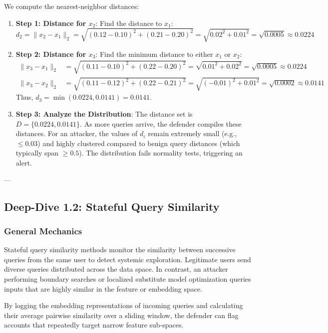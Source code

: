 \documentclass{article}
\begin{document}
We compute the nearest-neighbor distances:
\begin{enumerate}
    \item \textbf{Step 1: Distance for $x_2$}: Find the distance to $x_1$:
    $$d_2 = \|x_2 - x_1\|_2 = \sqrt{(0.12 - 0.10)^2 + (0.21 - 0.20)^2} = \sqrt{0.02^2 + 0.01^2} = \sqrt{0.0005} \approx 0.0224$$
    
    \item \textbf{Step 2: Distance for $x_3$}: Find the minimum distance to either $x_1$ or $x_2$:
    \begin{align*}
        \|x_3 - x_1\|_2 &= \sqrt{(0.11 - 0.10)^2 + (0.22 - 0.20)^2} = \sqrt{0.01^2 + 0.02^2} = \sqrt{0.0005} \approx 0.0224 \\
        \|x_3 - x_2\|_2 &= \sqrt{(0.11 - 0.12)^2 + (0.22 - 0.21)^2} = \sqrt{(-0.01)^2 + 0.01^2} = \sqrt{0.0002} \approx 0.0141
    \end{align*}
    Thus, $d_3 = \min(0.0224, 0.0141) = 0.0141$.
    
    \item \textbf{Step 3: Analyze the Distribution}: The distance set is $D = \{0.0224, 0.0141\}$. As more queries arrive, the defender compiles these distances. For an attacker, the values of $d_i$ remain extremely small (e.g., $\le 0.03$) and highly clustered compared to benign query distances (which typically span $\ge 0.5$). The distribution fails normality tests, triggering an alert.
\end{enumerate}

---

\subsection{Deep-Dive 1.2: Stateful Query Similarity}

\subsubsection{General Mechanics}
Stateful query similarity methods monitor the similarity between successive queries from the same user to detect systemic exploration. Legitimate users send diverse queries distributed across the data space. In contrast, an attacker performing boundary searches or localized substitute model optimization queries inputs that are highly similar in the feature or embedding space. 

By logging the embedding representations of incoming queries and calculating their average pairwise similarity over a sliding window, the defender can flag accounts that repeatedly target narrow feature sub-spaces.
\end{document}
